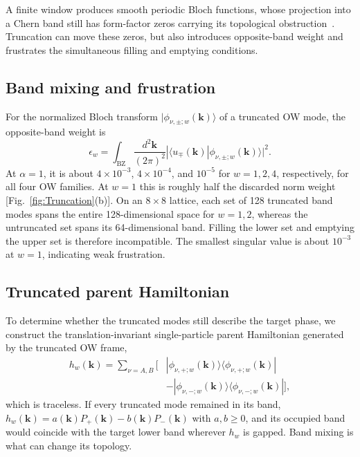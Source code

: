 \documentclass[aps,prb,10pt,twocolumn,superscriptaddress,longbibliography,floatfix]{revtex4-2}
\newcommand{\mr}[1]{\mathrm{#1}}
\newcommand{\bk}{\boldsymbol k}
\newcommand{\newtext}[1]{{\color{blue}#1}}
\begin{document}
\newtext{A finite window produces smooth periodic Bloch functions, whose projection into a Chern band still has form-factor zeros carrying its topological obstruction~\cite{BhuiyanPanJian2026,DubailRead2015}. Truncation can move these zeros, but also introduces opposite-band weight and frustrates the simultaneous filling and emptying conditions.}

{\color{blue}
\subsection{Band mixing and frustration}
\newtext{For the normalized Bloch transform $|\phi_{\nu,\pm;w}(\bk)\rangle$ of a truncated OW mode, the opposite-band weight is}
\begin{equation}
 \epsilon_w=\int_{\mr{BZ}}\frac{d^2\bk}{(2\pi)^2}
 |\langle u_\mp(\bk)|\phi_{\nu,\pm;w}(\bk)\rangle|^2.
 \label{eq:BandLeakage}
\end{equation}
\newtext{At $\alpha=1$, it is about $4\times10^{-3}$, $4\times10^{-4}$, and $10^{-5}$ for $w=1,2,4$, respectively, for all four OW families. At $w=1$ this is roughly half the discarded norm weight [Fig.~\ref{fig:Truncation}(b)]. On an $8\times8$ lattice, each set of 128 truncated band modes spans the entire 128-dimensional space for $w=1,2$, whereas the untruncated set spans its 64-dimensional band. Filling the lower set and emptying the upper set is therefore incompatible. The smallest singular value is about $10^{-3}$ at $w=1$, indicating weak frustration.}

}

\subsection{Truncated parent Hamiltonian}
\label{app:TruncatedParent}

To determine whether the truncated modes still describe the target phase, we construct the translation-invariant single-particle parent Hamiltonian generated by the truncated OW frame,
\begin{align}
    h_w(\bk)=\sum_{\nu=A,B}\Big[&|\phi_{\nu,+;w}(\bk)\rangle\langle\phi_{\nu,+;w}(\bk)|\nonumber\\
    &-|\phi_{\nu,-;w}(\bk)\rangle\langle\phi_{\nu,-;w}(\bk)|\Big],
    \label{eq:TruncatedParent}
\end{align}
which is traceless. If every truncated mode remained in its band, $h_w(\bk)=a(\bk)P_+(\bk)-b(\bk)P_-(\bk)$ with $a,b\geq0$, and its occupied band would coincide with the target lower band wherever $h_w$ is gapped. Band mixing is what can change its topology.
\end{document}
